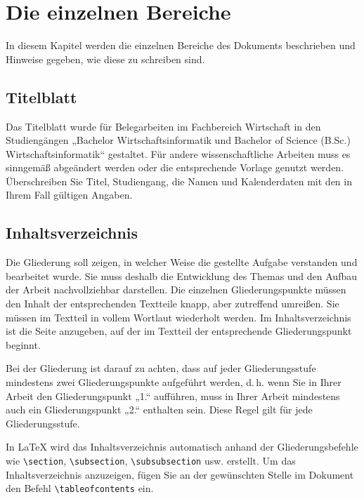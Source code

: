 \section{Die einzelnen Bereiche}

In diesem Kapitel werden die einzelnen Bereiche des Dokuments beschrieben und Hinweise gegeben, wie diese zu schreiben sind.

\subsection{Titelblatt}

Das Titelblatt wurde für Belegarbeiten im Fachbereich Wirtschaft in den Studiengängen „Bachelor Wirtschaftsinformatik und Bachelor of Science (B.Sc.) Wirtschaftsinformatik“ gestaltet. Für andere wissenschaftliche Arbeiten muss es sinngemäß abgeändert werden oder die entsprechende Vorlage genutzt werden. Überschreiben Sie Titel, Studiengang, die Namen und Kalenderdaten mit den in Ihrem Fall gültigen Angaben.

\subsection{Inhaltsverzeichnis}

Die Gliederung soll zeigen, in welcher Weise die gestellte Aufgabe verstanden und bearbeitet wurde. Sie muss deshalb die Entwicklung des Themas und den Aufbau der Arbeit nachvollziehbar darstellen. Die einzelnen Gliederungspunkte müssen den Inhalt der entsprechenden Textteile knapp, aber zutreffend umreißen. Sie müssen im Textteil in vollem Wortlaut wiederholt werden. Im Inhaltsverzeichnis ist die Seite anzugeben, auf der im Textteil der entsprechende Gliederungspunkt beginnt.

Bei der Gliederung ist darauf zu achten, dass auf jeder Gliederungsstufe mindestens zwei Gliederungspunkte aufgeführt werden, d.\,h. wenn Sie in Ihrer Arbeit den Gliederungspunkt „1.“ aufführen, muss in Ihrer Arbeit mindestens auch ein Gliederungspunkt „2.“ enthalten sein. Diese Regel gilt für jede Gliederungsstufe.

In \LaTeX{} wird das Inhaltsverzeichnis automatisch anhand der Gliederungsbefehle wie \verb|\section|, \verb|\subsection|, \verb|\subsubsection| usw. erstellt. Um das Inhaltsverzeichnis anzuzeigen, fügen Sie an der gewünschten Stelle im Dokument den Befehl \verb|\tableofcontents| ein.

